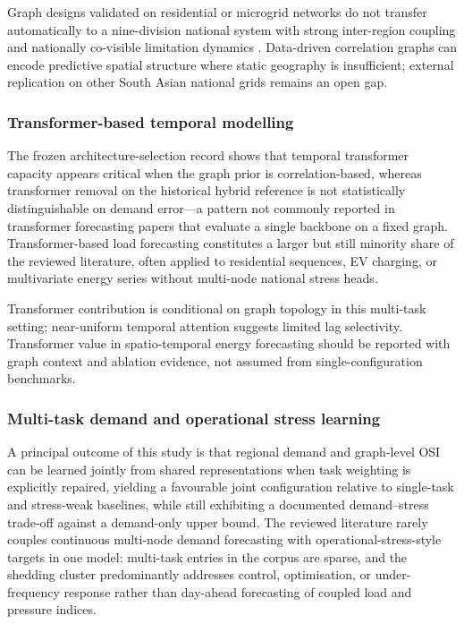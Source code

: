 Graph designs validated on residential or microgrid networks do not transfer automatically to a nine-division national system with strong inter-region coupling and nationally co-visible limitation dynamics \cite{Zhao2024GraphAttentionTransformer,Bentsen2023GraphTransformer,Sun2024GLFN}. Data-driven correlation graphs can encode predictive spatial structure where static geography is insufficient; external replication on other South Asian national grids remains an open gap.

\subsubsection{Transformer-based temporal modelling}\label{subsubsection:transformer_based_temporal_modelling}

The frozen architecture-selection record shows that temporal transformer capacity appears critical when the graph prior is correlation-based, whereas transformer removal on the historical hybrid reference is not statistically distinguishable on demand error---a pattern not commonly reported in transformer forecasting papers that evaluate a single backbone on a fixed graph. Transformer-based load forecasting \cite{Wu2021Autoformer,Helmy2024AutoformerEV} constitutes a larger but still minority share of the reviewed literature, often applied to residential sequences, EV charging, or multivariate energy series without multi-node national stress heads.

Transformer contribution is conditional on graph topology in this multi-task setting; near-uniform temporal attention suggests limited lag selectivity. Transformer value in spatio-temporal energy forecasting should be reported with graph context and ablation evidence, not assumed from single-configuration benchmarks.

\subsubsection{Multi-task demand and operational stress learning}\label{subsubsection:multi_task_demand_and_operational_stress_learning}

A principal outcome of this study is that regional demand and graph-level OSI can be learned jointly from shared representations when task weighting is explicitly repaired, yielding a favourable joint configuration relative to single-task and stress-weak baselines, while still exhibiting a documented demand--stress trade-off against a demand-only upper bound. The reviewed literature rarely couples continuous multi-node demand forecasting with operational-stress-style targets in one model: multi-task entries in the corpus are sparse, and the shedding cluster predominantly addresses control, optimisation, or under-frequency response rather than day-ahead forecasting of coupled load and pressure indices.

